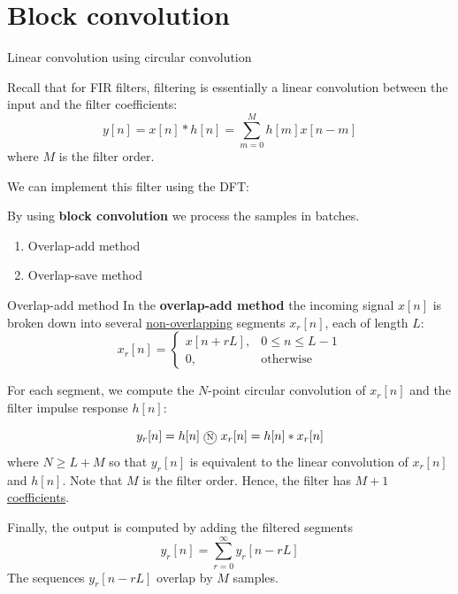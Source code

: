 \documentclass[10pt]{beamer}
\begin{document}
\section{Block convolution}
\begin{frame}{Linear convolution using circular convolution}

	Recall that for FIR filters, filtering is essentially a linear convolution between the input and the filter coefficients:
	\begin{equation*}
		y[n] = x[n] \ast h[n] = \sum_{m =0}^{M} h[m]x[n-m]
	\end{equation*}
	where $M$ is the filter order.
	
	\vspace{0.25cm}
	We can implement this filter using the DFT:
	\begin{center}
		\resizebox{0.8\textwidth}{!}{}
	\end{center}

	By using \textbf{block convolution} we process the samples in batches.
	\begin{enumerate}
		\item Overlap-add method
		\item Overlap-save method
	\end{enumerate}
\end{frame}


\begin{frame}{Overlap-add method}
In the \textbf{overlap-add method} the incoming signal $x[n]$ is broken down into several \underline{non-overlapping} segments $x_r[n]$, each of length $L$:
\begin{equation*}
	x_r[n] = \begin{cases}
	x[n + rL], & 0 \leq n \leq L-1\\
	0, & \text{otherwise}
	\end{cases}
\end{equation*}

For each segment, we compute the $N$-point circular convolution of $x_r[n]$ and the filter impulse response $h[n]$:

\begin{equation*}
	y_r[n] = h[n]~\encircle{N}~x_r[n] = h[n]\ast x_r[n]
\end{equation*}
where $N \geq L + M$ so that $y_r[n]$ is equivalent to the linear convolution of $x_r[n]$ and $h[n]$. Note that $M$ is the filter order. Hence, the filter has \underline{$M+1$ coefficients}.

Finally, the output is computed by adding the filtered segments
\begin{equation*}
	y_r[n] = \sum_{r = 0}^{\infty} y_r[n - rL]
\end{equation*}
The sequences $y_r[n-rL]$ overlap by $M$ samples.
\end{frame}
\end{document}
